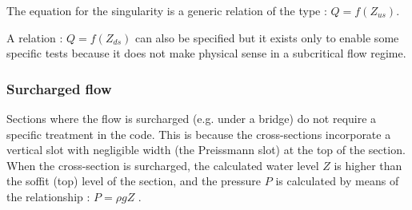 \hspace*{1cm}

The equation for the singularity is a generic relation of the type : $Q = f(Z_{us})$.

\vspace{0.5cm}

A relation : $Q = f(Z_{ds})$ can also be specified but it exists only to enable some specific tests because it does not make physical sense in a subcritical flow regime. 


\subsubsection{Surcharged flow}

Sections where the flow is surcharged (e.g. under a bridge) do not require a specific treatment in the code. 
This is because the cross-sections incorporate a vertical slot with negligible width (the Preissmann slot) at the top of the section. When the cross-section is surcharged, the calculated water level $Z$ is higher than the soffit (top) level of the section, and the pressure $P$ is calculated by means of the relationship : $P = \rho g Z$ .


